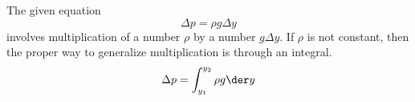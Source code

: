 The given equation
\begin{equation*}
  \Delta p = \rho g \Delta y
\end{equation*}
involves multiplication of a number $\rho$ by a number $g\Delta y$. If $\rho$ is not constant,
then the proper way to generalize multiplication is through an integral.
\begin{equation*}
  \Delta p = \int_{y_1}^{y_2} \rho g \der y
\end{equation*}
